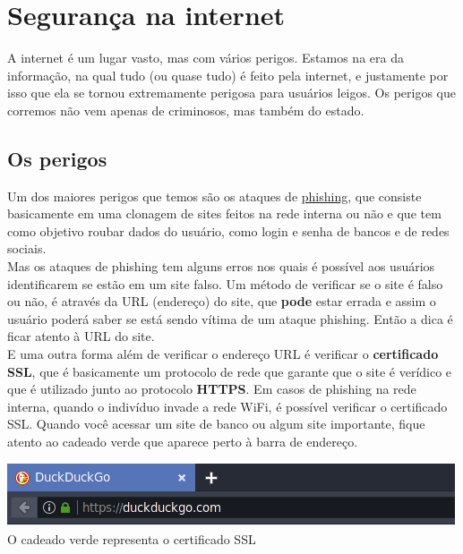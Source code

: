 \documentclass[12pt, letterpaper, DejaVuSansMono:12]{report}
\begin{document}
\section{Segurança na internet}
	A internet é um lugar vasto, mas com vários perigos. Estamos na era da informação, na qual tudo (ou quase tudo) é feito pela internet, e justamente por isso que ela se tornou extremamente perigosa para usuários leigos. Os perigos que corremos não vem apenas de criminosos, mas também do estado.\\

\subsection{Os perigos}

	Um dos maiores perigos que temos são os ataques de \href{https://criptowiki.miraheze.org/wiki/Phishing}{phishing}, que consiste basicamente em uma clonagem de sites feitos na rede interna ou não e que tem como objetivo roubar dados do usuário, como login e senha de bancos e de redes sociais.\\

	Mas os ataques de phishing tem alguns erros nos quais é possível aos usuários identificarem se estão em um site falso. Um método de verificar se o site é falso ou não, é através da URL (endereço) do site, que \textbf{pode} estar errada e assim o usuário poderá saber se está sendo vítima de um ataque phishing. Então a dica é ficar atento à URL do site.\\

	E uma outra forma além de verificar o endereço URL é verificar o \textbf{certificado SSL}, que é basicamente um protocolo de rede que garante que o site é verídico e que é utilizado junto ao protocolo \textbf{HTTPS}. Em casos de phishing na rede interna, quando o indivíduo invade a rede WiFi, é possível verificar o certificado SSL. Quando você acessar um site de banco ou algum site importante, fique atento ao cadeado verde que aparece perto à barra de endereço.

	\begin{center} %
		\includegraphics[scale=1]{Duck.png}\\
		\footnotesize O cadeado verde representa o certificado SSL
	\end{center}
\end{document}

